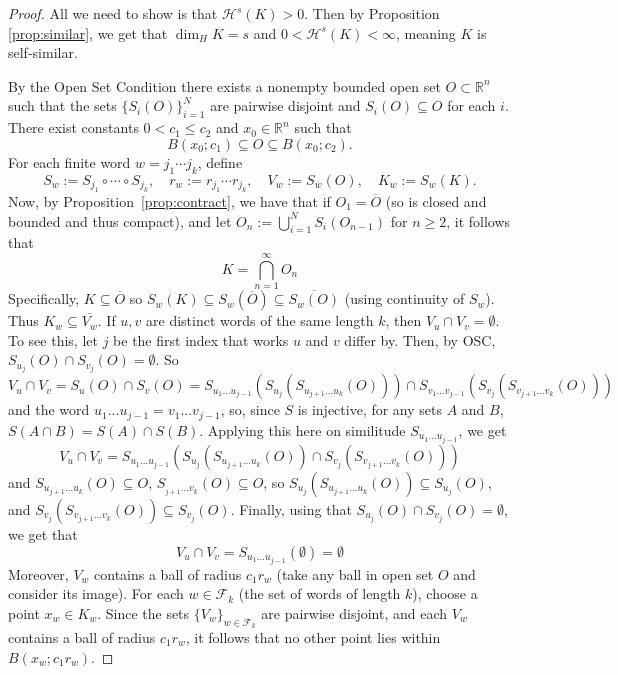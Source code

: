 \documentclass{article}
\theoremstyle{plain}
\theoremstyle{definition}
\theoremstyle{remark}
\begin{document}

\begin{proof}
All we need to show is that $\mathcal{H}^s(K) > 0$. Then by Proposition \ref{prop:similar}, we get that $\dim_H K = s$ and $0 < \mathcal{H}^s(K) < \infty$, meaning $K$ is self-similar. 

\medskip
\noindent 
By the Open Set Condition there exists a nonempty bounded open set $O \subset \mathbb{R}^n$ such that the sets $\{S_i(O)\}_{i=1}^N$ are pairwise disjoint and $S_i(O) \subseteq O$ for each $i$.  
There exist constants $0 < c_1 \le c_2$ and $x_0 \in \mathbb{R}^n$ such that 
\[
B(x_0; c_1) \subseteq O \subseteq B(x_0; c_2).
\]
For each finite word $w = j_1 \cdots j_k$, define
\[
S_w := S_{j_1} \circ \cdots \circ S_{j_k}, 
\quad r_w := r_{j_1} \cdots r_{j_k}, 
\quad V_w := S_w(O), 
\quad K_w := S_w(K).
\]
Now, by Proposition~\ref{prop:contract}, we have that if $O_1 = \overline{O}$ (so is closed and bounded and thus compact), and let $O_{n} := \bigcup \limits _{i=1}^N S_i(O_{n-1})$ for $n \ge 2$, it follows that \[
K = \bigcap \limits _{n=1}^{\infty} O_n
\]
Specifically, $K \subseteq \overline{O}$ so $S_w(K) \subseteq S_w(\overline{O}) \subseteq \overline{S_w(O)}$ (using continuity of $S_w$). Thus $K_w \subseteq \overline{V_w}$. 
If $u,v$ are distinct words of the same length $k$, then $V_u \cap V_v = \emptyset$. To see this, let $j$ be the first index that works $u$ and $v$ differ by. Then, by OSC, $S_{u_j} (O) \cap S_{v_j} (O) = \emptyset$. So \[
V_u \cap V_v = S_u (O) \cap S_v (O) = S_{u_1...u_{{j-1}}} (S_{u_j}(S_{u_{j+1}...u_{k}}(O))) \cap S_{v_1...v_{{j-1}}} (S_{v_j}(S_{v_{j+1}...v_{k}}(O))) 
\]
and the word $u_1...u_{j-1} = v_1...v_{j-1}$, so, since $S$ is injective, for any sets $A$ and $B$, $S(A \cap B) = S(A) \cap S(B)$. Applying this here on similitude $S_{u_1...u_{j-1}}$, we get \[
V_u \cap V_v = S_{u_1...u_{j-1}}(S_{u_j}(S_{u_{j+1}...u_k}(O)) \cap S_{v_j}(S_{v_{j+1}...v_k}(O)))
\]
and $S_{u_{j+1}...u_k}(O) \subseteq O$, $S_{_{j+1}...v_k}(O) \subseteq O$, so $S_{u_j} (S_{u_{j+1}...u_k}(O)) \subseteq S_{u_j} (O)$, and $S_{v_j} (S_{v_{j+1}...v_k}(O)) \subseteq S_{v_j} (O)$. Finally, using that $S_{u_j} (O) \cap S_{v_j} (O) = \emptyset$, we get that \[
V_u \cap V_v = S_{u_1...u_{j-1}} (\emptyset) = \emptyset
\]
Moreover, $V_w$ contains a ball of radius $c_1 r_w$ (take any ball in open set $O$ and consider its image). For each $w \in \mathcal{F}_k$ (the set of words of length $k$), choose a point $x_w \in K_w$. Since the sets $\{V_w\}_{w \in \mathcal{F}_k}$ are pairwise disjoint, and each $V_w$ contains a ball of radius $c_1 r_w $, it follows that no other point lies within $B(x_w; c_1r_w)$. 

\end{proof}
\end{document}
